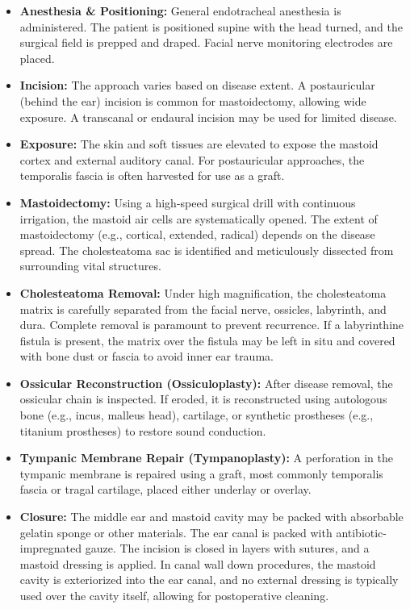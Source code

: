 \begin{itemize}
  \item \textbf{Anesthesia \& Positioning:} General endotracheal anesthesia is administered. The patient is positioned supine with the head turned, and the surgical field is prepped and draped. Facial nerve monitoring electrodes are placed.
  
  \item \textbf{Incision:} The approach varies based on disease extent. A postauricular (behind the ear) incision is common for mastoidectomy, allowing wide exposure. A transcanal or endaural incision may be used for limited disease.
  
  \item \textbf{Exposure:} The skin and soft tissues are elevated to expose the mastoid cortex and external auditory canal. For postauricular approaches, the temporalis fascia is often harvested for use as a graft.
  
  \item \textbf{Mastoidectomy:} Using a high-speed surgical drill with continuous irrigation, the mastoid air cells are systematically opened. The extent of mastoidectomy (e.g., cortical, extended, radical) depends on the disease spread. The cholesteatoma sac is identified and meticulously dissected from surrounding vital structures.
  
  \item \textbf{Cholesteatoma Removal:} Under high magnification, the cholesteatoma matrix is carefully separated from the facial nerve, ossicles, labyrinth, and dura. Complete removal is paramount to prevent recurrence. If a labyrinthine fistula is present, the matrix over the fistula may be left in situ and covered with bone dust or fascia to avoid inner ear trauma.
  
  \item \textbf{Ossicular Reconstruction (Ossiculoplasty):} After disease removal, the ossicular chain is inspected. If eroded, it is reconstructed using autologous bone (e.g., incus, malleus head), cartilage, or synthetic prostheses (e.g., titanium prostheses) to restore sound conduction.
  
  \item \textbf{Tympanic Membrane Repair (Tympanoplasty):} A perforation in the tympanic membrane is repaired using a graft, most commonly temporalis fascia or tragal cartilage, placed either underlay or overlay.
  
  \item \textbf{Closure:} The middle ear and mastoid cavity may be packed with absorbable gelatin sponge or other materials. The ear canal is packed with antibiotic-impregnated gauze. The incision is closed in layers with sutures, and a mastoid dressing is applied. In canal wall down procedures, the mastoid cavity is exteriorized into the ear canal, and no external dressing is typically used over the cavity itself, allowing for postoperative cleaning.
\end{itemize}


